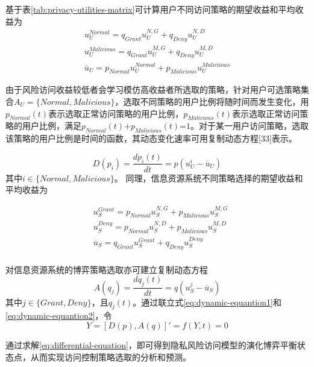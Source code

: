 基于表\ref{tab:privacy-utilities-matrix}可计算用户不同访问策略的期望收益和平均收益为
\begin{eqnarray}\label{eq:utilities-users}
u_{U}^{Normal}={{q}_{Grant}}u_{U}^{N,G}+{{q}_{Deny}}u_{U}^{N,D} \\ 
 u_{U}^{Malicious}={{q}_{Grant}}u_{U}^{M,G}+{{q}_{Deny}}u_{U}^{M,D} \\ 
{{\overline{u}}_{U}}={{p}_{Normal}}u_{U}^{Normal}+{{p}_{Malicious}}u_{U}^{Malic\text{i}ious}
\end{eqnarray}


由于风险访问收益较低者会学习模仿高收益者所选取的策略，针对用户可选策略集合${{A}_{U}}=\{Normal,Malicious\}$，选取不同策略的用户比例将随时间而发生变化，用${{p}_{Normal}}(t)$表示选取正常访问策略的用户比例，${{p}_{Malicious}}(t)$表示选取正常访问策略的用户比例，满足${{p}_{Normal}}(t)\text{+}{{p}_{Malicious}}(t)\text{=}1$。对于某一用户访问策略，选取该策略的用户比例是时间的函数，其动态变化速率可用复制动态方程[33]表示。

\begin{equation}\label{eq:dynamic-equantion1}
D({{p}_{i}})=\frac{d{{p}_{i}}(t)}{dt}=p(u_{U}^{i}-{{\overline{u}}_{U}})
\end{equation}
其中$i\in \{Normal,Malicious\}$。
同理，信息资源系统不同策略选择的期望收益和平均收益为

\begin{align}
& u_{S}^{Grant}={{p}_{Normal}}u_{S}^{N,G}+{{p}_{Malicious}}u_{S}^{M,G} \\ 
& u_{S}^{Deny}={{p}_{Normal}}u_{S}^{N,D}+{{p}_{Malicious}}u_{S}^{M,D} \\ 
& {{\overline{u}}_{S}}={{q}_{Grant}}u_{S}^{Grant}+{{q}_{Deny}}u_{S}^{Deny} \\ 
\end{align}

对信息资源系统的博弈策略选取亦可建立复制动态方程
\begin{equation}\label{eq:dynamic-equantion2}
A({{q}_{j}})=\frac{d{{q}_{j}}(t)}{dt}=q(u_{S}^{j}-{{\overline{u}}_{S}})
\end{equation}
其中$j\in \{Grant,Deny\}$，且${{q}_{j}}(t)$。通过联立式\ref{eq:dynamic-equantion1}和\ref{eq:dynamic-equantion2}，令
\begin{equation}\label{eq:differential-equation}
Y=[ D(p), A(q)]'=f(Y,t)=0
\end{equation}

通过求解\ref{eq:differential-equation}，即可得到隐私风险访问模型的演化博弈平衡状态点，从而实现访问控制策略选取的分析和预测。

